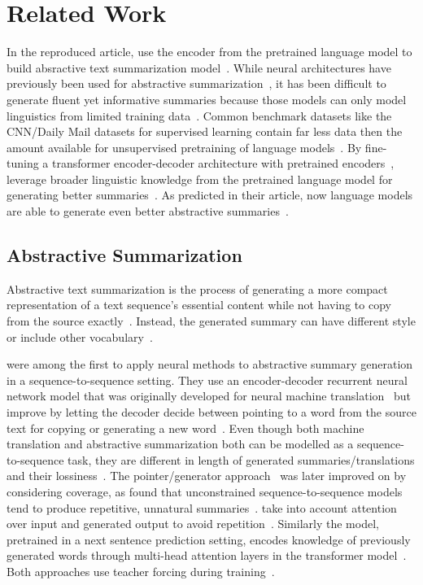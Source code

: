 \section{Related Work} %

In the reproduced article, \citeauthor{LiuL2019} use the encoder from the pretrained \Bert language model to build absractive text summarization model~\cite{LiuL2019,DevlinCLT2019}.
While neural architectures have previously been used for abstractive summarization~\cite{NallapatiZSGX2016,SeeLM2017,PaulusXS2018}, it has been difficult to generate fluent yet informative summaries because those models can only model linguistics from limited training data~\todocite.
Common benchmark datasets like the CNN/Daily Mail datasets for supervised learning contain far less data then the amount available for unsupervised pretraining of language models~\cite{HermannKGEKSB2015,DevlinCLT2019}.
By fine-tuning a transformer encoder-decoder architecture with pretrained encoders~\cite{VaswaniSPUJGKP2017,DevlinCLT2019}, \citeauthor{LiuL2019} leverage broader linguistic knowledge from the pretrained language model for generating better summaries~\cite{LiuL2019}.
As predicted in their article, now  language models are able to generate even better abstractive summaries~\todocite\cite{LiuL2019}.

\subsection{Abstractive Summarization}

Abstractive text summarization is the process of generating a more compact representation of a text sequence's essential content while not having to copy from the source exactly~\cite[28]{Torres-Moreno2014}. Instead, the generated summary can have different style or include other vocabulary~\cite{NallapatiZSGX2016}.

\citeauthor{NallapatiZSGX2016} were among the first to apply neural methods to abstractive summary generation in a sequence-to-sequence setting. They use an encoder-decoder recurrent neural network model that was originally developed for neural machine translation~\cite{https://arxiv.org/abs/1409.0473} but improve by letting the decoder decide between pointing to a word from the source text for copying or generating a new word~\cite{NallapatiZSGX2016}.
Even though both machine translation and abstractive summarization both can be modelled as a sequence-to-sequence task, they are different in length of generated summaries/translations and their lossiness~\cite{NallapatiZSGX2016}.
The pointer/generator approach~\cite{NallapatiZSGX2016} was later improved on by considering coverage, as \citeauthor{SeeLM2017} found that unconstrained sequence-to-sequence models tend to produce repetitive, unnatural summaries~\cite{SeeLM2017,PaulusXS2018}.
\citeauthor{PaulusXS2018} take into account attention over input and generated output to avoid repetition~\cite{PaulusXS2018}.
Similarly the \Bert model, pretrained in a next sentence prediction setting, encodes knowledge of previously generated words through multi-head attention layers in the transformer model~\cite{DevlinCLT2019}.
Both approaches use teacher forcing during training~\cite{PaulusXS2018,DevlinCLT2019}.

